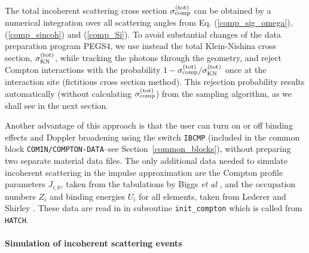 The total incoherent scattering cross section $\sigma_{\rm comp}^{\rm (tot)}$ 
can be obtained 
by a numerical integration over all scattering angles from 
Eq. (\ref{comp_sig_omega}), (\ref{comp_sincoh}) and 
(\ref{comp_Si}). To 
avoid substantial changes of the data preparation program PEGS4, 
we use instead the total Klein-Nishina cross section, 
$\sigma_{\rm KN}^{\rm (tot)}$, while tracking the photons through 
the geometry, and reject Compton interactions with the probability 
$1-\sigma_{\rm comp}^{\rm (tot)}/\sigma_{\rm KN}^{\rm (tot)}$ once 
at the interaction site (fictitious cross section method). 
This rejection probability results automatically (without 
calculating $\sigma_{\rm comp}^{\rm (tot)}$) from the sampling 
algorithm, as we shall see in the next section. 

Another advantage of this approach is that the user can 
turn on or off binding effects and Doppler broadening 
using the switch {\tt IBCMP} (included in the common
block {\tt COMIN/COMPTON-DATA}--see Section~\ref{common_blocks}), 
without preparing two 
separate material data files. The only additional data 
needed to simulate incoherent scattering in the impulse 
approximation are the Compton profile parameters 
$J_{i,0}$, taken from the tabulations by Biggs {\em et al} 
\cite{BM75}, and the occupation numbers $Z_i$ and 
binding energies $U_i$ for all elements, taken from 
Lederer and Shirley \cite{LS78}. These data are read in 
in subroutine {\tt init\_compton} which is called from 
{\tt HATCH}.

\paragraph{Simulation of incoherent scattering events}\hfill
{}

